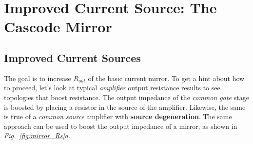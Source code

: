 \section{Improved Current Source:  The Cascode Mirror}
\subsection{Improved Current Sources}
The goal is to increase $R_{out}$ of the basic current mirror.  To get a hint about how to proceed, let's look at typical \textit{amplifier} output resistance results to see topologies that boost resistance.  The output impedance of the \textit{common gate} stage is boosted by placing a resistor in the source of the amplifier.  Likewise, the same is true of a \textit{common source} amplifier with \textbf{source degeneration}.  The same approach can be used to boost the output impedance of a mirror, as shown in \emph{Fig.~\ref{fig:mirror_Rs}a}.
